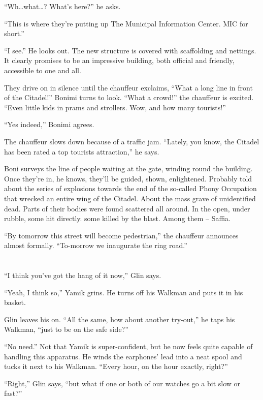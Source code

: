 \documentclass[twoside,11pt]{book}
\begin{document}
``Wh{\ldots}what{\dots}? What's here?'' he asks.

``This is where they're putting up The Municipal Information Center. MIC for short.''

``I see.'' He looks out. The new structure is covered with scaffolding and nettings.
It clearly promises to be an impressive building, both official and friendly, accessible to one and
all.

They drive on in silence until the chauffeur exclaims, ``What a long line in front of the
Citadel!'' Bonimi turns to look. ``What a crowd!'' the chauffeur is excited.
``Even little kids in prams and strollers. Wow, and how many tourists!''

``Yes indeed,'' Bonimi agrees.

The chauffeur slows down because of a traffic jam. ``Lately, you know, the Citadel has been rated a top
tourists attraction,'' he says.

Boni surveys the line of people waiting at the gate, winding round the building. Once they're in, he knows, they'll be
guided, shown, enlightened. Probably told about the series of explosions towards the end of the so-called Phony
Occupation that wrecked an entire wing of the Citadel. About the mass grave of unidentified dead. Parts of their
bodies were found scattered all around. In the open, under rubble, some hit directly. some killed by the blast. Among
them -- Saffia.

``By tomorrow this street will become pedestrian,'' the chauffeur announces almost formally.
``To-morrow we inaugurate the ring road.''


\bigskip

\chapter{}

``I think you've got the hang of it now,'' Glin says.

``Yeah, I think so,'' Yamik grins. He turns off his Walkman and puts it in his basket.

Glin leaves his on. ``All the same, how about another try-out,'' he taps his Walkman, ``just
to be on the safe side?''

``No need.'' Not that Yamik is super-confident, but he now feels quite capable of handling
this apparatus. He winds the earphones' lead into a neat spool and tucks it next to his Walkman. ``Every
hour, on the hour exactly, right?''

``Right,'' Glin says, ``but what if one or both of our watches go a bit slow or
fast?''
\end{document}

